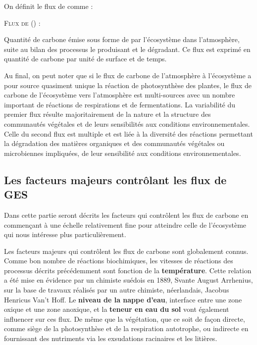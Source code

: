 On définit le flux de \chh comme : 
\begin{pdef}
\textsc{Flux de \chh (\fchh)} :

Quantité de carbone émise sous forme de \chh par l'écosystème dans l'atmosphère, suite au bilan des processus le produisant et le dégradant.
Ce flux est exprimé en quantité de carbone par unité de surface et de temps.
\end{pdef}




Au final, on peut noter que si le flux de carbone de l'atmosphère à l'écosystème a pour source quasiment unique la réaction de photosynthèse des plantes, le flux de carbone de l'écosystème vers l'atmosphère est multi-sources avec un nombre important de réactions de respirations et de fermentations.
La variabilité du premier flux résulte majoritairement de la nature et la structure des communautés végétales et de leurs sensibilités aux conditions environnementales.
Celle du second flux est multiple et est liée à la diversité des réactions permettant la dégradation des matières organiques et des communautés végétales ou microbiennes impliquées, de leur sensibilité aux conditions environnementales.

\subsection{Les facteurs majeurs contrôlant les flux de GES}

Dans cette partie seront décrits les facteurs qui contrôlent les flux de carbone en commençant à une échelle relativement fine pour atteindre celle de l'écosystème qui nous intéresse plus particulièrement.

Les facteurs majeurs qui contrôlent les flux de carbone sont globalement connus.
Comme bon nombre de réactions biochimiques, les vitesses de réactions des processus décrits précédemment sont fonction de la \textbf{température}.
Cette relation  a été mise en évidence par un chimiste suédois en 1889, Svante August Arrhenius, sur la base de travaux réalisés par un autre chimiste, néerlandais, Jacobus Henricus Van't Hoff.
Le \textbf{niveau de la nappe d'eau}, interface entre une zone oxique et une zone anoxique, et la \textbf{teneur en eau du sol} vont également influencer sur ces flux.
De même que la végétation, que ce soit de façon directe, comme siège de la photosynthèse et de la respiration autotrophe, ou indirecte en fournissant des nutriments via les exsudations racinaires et les litières.


